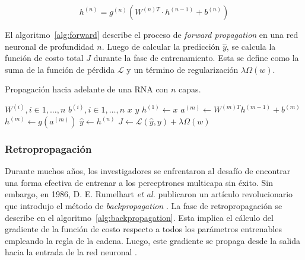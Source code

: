 \begin{equation}
	\label{eq:forward}
	h^{(n)} = g^{(n)} (W^{(n)T} \cdot h^{(n-1)} + b^{(n)})
\end{equation}

El algoritmo~\ref{alg:forward} describe el proceso de \emph{forward propagation} en una red neuronal de profundidad $n$. 
Luego de calcular la predicción $\hat{y}$, se calcula la función de costo total $J$ durante la fase de entrenamiento. 
Esta se define como la suma de la función de pérdida $\mathcal{L}$ y un término de regularización $\lambda \Omega(w)$.

\begin{algorithm}
	\caption{Propagación hacia adelante de una RNA con $n$ capas.}
	\label{alg:forward}
	\begin{algorithmic}
		\Require $W^{(i)}, i \in 1, \ldots, n$ 
		\Require $b^{(i)}, i \in 1, \ldots, n$ 
		\Require $x$ 
		\Require $y$ 
		\State $h^{(1)} \gets x$
		\State $a^{(m)} \gets W^{(m)T}h^{(m-1)} + b^{(m)} $
		\State $h^{(m)} \gets g(a^{(m)})$
		\EndFor
		\State $\hat{y} \gets h^{(n)}$
		\State $J \gets \mathcal{L}(\hat{y}, y) + \lambda \Omega(w)$ 
	\end{algorithmic}
\end{algorithm}

\subsubsection{Retropropagación}

Durante muchos años, los investigadores se enfrentaron al desafío de encontrar una forma 
efectiva de entrenar a los perceptrones multicapa sin éxito. Sin embargo, en 1986, D. E. 
Rumelhart \emph{et al.} publicaron un artículo revolucionario que introdujo el método 
de \emph{backpropagation} \citep{CITE:47}. La fase de retropropagación se describe en el 
algoritmo~\ref{alg:backpropagation}. Esta implica el cálculo del gradiente de la función de 
costo respecto a todos los parámetros entrenables empleando la regla de la cadena. 
Luego, este gradiente se propaga desde la salida hacia la entrada de la red neuronal \citep{CITE:35} \citep{CITE:42} \citep{CITE:44}.

